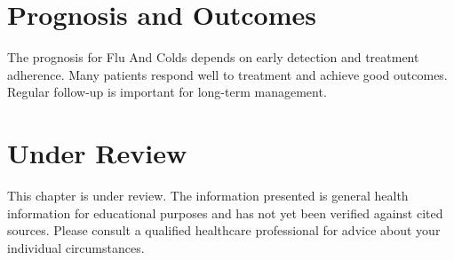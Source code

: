 \section*{Prognosis and Outcomes}
The prognosis for Flu And Colds depends on early detection and treatment adherence. Many patients respond well to treatment and achieve good outcomes. Regular follow-up is important for long-term management.
\section*{Under Review}
This chapter is under review. The information presented is general health information for educational purposes and has not yet been verified against cited sources. Please consult a qualified healthcare professional for advice about your individual circumstances.


\clearpage
